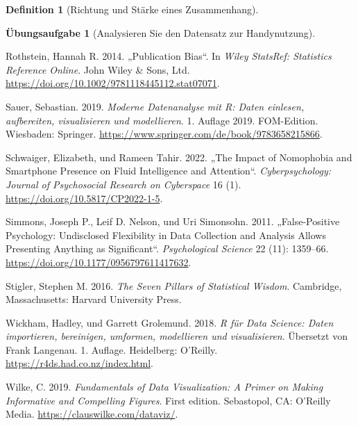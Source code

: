 \documentclass[
  a4paper,
  DIV=11]{scrreprt}
\newlength{\cslhangindent}
\newenvironment{CSLReferences}[2] %
 {\begin{list}{}{%
  \setlength{\itemindent}{0pt}
  \setlength{\leftmargin}{0pt}
  \setlength{\parsep}{0pt}
  \ifodd #1
   \setlength{\leftmargin}{\cslhangindent}
   \setlength{\itemindent}{-1\cslhangindent}
  \fi
  \setlength{\itemsep}{#2\baselineskip}}}
 {\end{list}}
\theoremstyle{definition}
\newtheorem{exercise}{Übungsaufgabe}[chapter]
\theoremstyle{definition}
\theoremstyle{definition}
\newtheorem{definition}{Definition}[chapter]
\theoremstyle{remark}
\begin{document}
\begin{definition}[Richtung und Stärke eines
Zusammenhang]
\begin{exercise}[Analysieren Sie den Datensatz zur
Handynutzung]
\begin{CSLReferences}{1}{0}
Rothstein, Hannah R. 2014. {„Publication {Bias}``}. In \emph{Wiley
{StatsRef}: {Statistics Reference Online}}. John Wiley \& Sons, Ltd.
\url{https://doi.org/10.1002/9781118445112.stat07071}.

Sauer, Sebastian. 2019. \emph{Moderne Datenanalyse mit R: Daten
einlesen, aufbereiten, visualisieren und modellieren}. 1. Auflage 2019.
FOM-Edition. Wiesbaden: Springer.
\url{https://www.springer.com/de/book/9783658215866}.

Schwaiger, Elizabeth, und Rameen Tahir. 2022. {„The Impact of Nomophobia
and Smartphone Presence on Fluid Intelligence and Attention``}.
\emph{Cyberpsychology: Journal of Psychosocial Research on Cyberspace}
16 (1). \url{https://doi.org/10.5817/CP2022-1-5}.

Simmons, Joseph P., Leif D. Nelson, und Uri Simonsohn. 2011.
{„False-{Positive Psychology}: {Undisclosed Flexibility} in {Data
Collection} and {Analysis Allows Presenting Anything} as
{Significant}``}. \emph{Psychological Science} 22 (11): 1359--66.
\url{https://doi.org/10.1177/0956797611417632}.

Stigler, Stephen M. 2016. \emph{The Seven Pillars of Statistical
Wisdom}. Cambridge, Massachusetts: Harvard University Press.

Wickham, Hadley, und Garrett Grolemund. 2018. \emph{R für Data Science:
Daten importieren, bereinigen, umformen, modellieren und visualisieren}.
Übersetzt von Frank Langenau. 1. Auflage. Heidelberg: O'Reilly.
\url{https://r4ds.had.co.nz/index.html}.

Wilke, C. 2019. \emph{Fundamentals of Data Visualization: A Primer on
Making Informative and Compelling Figures}. First edition. Sebastopol,
CA: O'Reilly Media. \url{https://clauswilke.com/dataviz/}.

\end{CSLReferences}

\end{exercise}

\end{definition}
\end{document}
